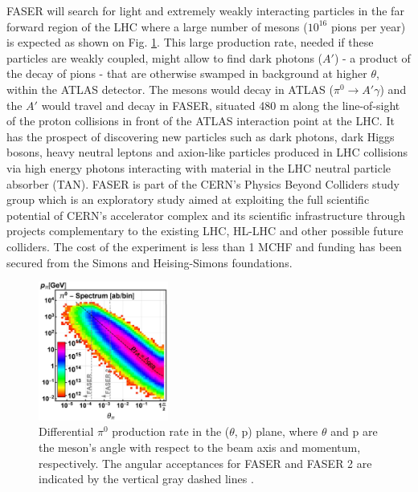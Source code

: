 FASER will search for light and extremely weakly interacting particles in the far forward region of the LHC where a large number of mesons ($10^{16}$ pions per year) is expected as shown on Fig. \ref{fig:momentumVSangle}. This large production rate, needed if these particles are weakly coupled, might allow to find dark photons ($A'$) - a product of the decay of pions - that are otherwise swamped in background at higher $\theta$, within the ATLAS detector. The mesons would decay in ATLAS ($\pi^{0}\rightarrow A'\gamma$) and the $A'$ would travel and decay in FASER, situated 480 m along the line-of-sight of the proton collisions in front of the ATLAS interaction point at the LHC. It has the prospect of discovering new particles such as dark photons, dark Higgs bosons, heavy neutral leptons and axion-like particles produced in LHC collisions via high energy
photons interacting with material in the LHC neutral particle absorber
(TAN). FASER is part of the CERN's Physics Beyond Colliders study group which is an exploratory study aimed at exploiting the full scientific potential of CERN's accelerator complex and its scientific infrastructure through projects complementary to the existing LHC, HL-LHC and other possible future colliders. The cost of the
experiment is less than 1 MCHF and funding has been secured from the Simons and Heising-Simons foundations.

\begin{figure}
  \centering
    \includegraphics[width=0.38\textwidth]{Introduction/Figs/Raster/momentumVSangle.jpg} 
    \caption[Momentum vs angle]{Differential $\pi^{0}$ production rate in the ($\theta$, p) plane, where $\theta$ and p are the meson’s angle with respect to the beam axis and momentum, respectively. The angular acceptances for FASER and FASER 2 are indicated by the vertical gray dashed lines \cite{faser_collaboration_fasers_2019}.}
    \label{fig:momentumVSangle}
\end{figure}

